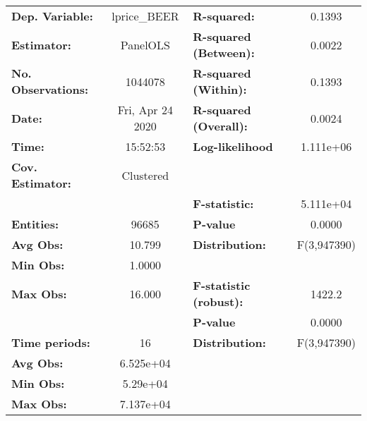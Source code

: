 \documentclass{report}
\begin{document}
\begin{center}
\begin{tabular}{lclc}
\toprule
\textbf{Dep. Variable:}       &    lprice\_BEER    & \textbf{  R-squared:         }   &      0.1393      \\
\textbf{Estimator:}           &      PanelOLS      & \textbf{  R-squared (Between):}  &      0.0022      \\
\textbf{No. Observations:}    &      1044078       & \textbf{  R-squared (Within):}   &      0.1393      \\
\textbf{Date:}                &  Fri, Apr 24 2020  & \textbf{  R-squared (Overall):}  &      0.0024      \\
\textbf{Time:}                &      15:52:53      & \textbf{  Log-likelihood     }   &    1.111e+06     \\
\textbf{Cov. Estimator:}      &     Clustered      & \textbf{                     }   &                  \\
\textbf{}                     &                    & \textbf{  F-statistic:       }   &    5.111e+04     \\
\textbf{Entities:}            &       96685        & \textbf{  P-value            }   &      0.0000      \\
\textbf{Avg Obs:}             &       10.799       & \textbf{  Distribution:      }   &   F(3,947390)    \\
\textbf{Min Obs:}             &       1.0000       & \textbf{                     }   &                  \\
\textbf{Max Obs:}             &       16.000       & \textbf{  F-statistic (robust):} &      1422.2      \\
\textbf{}                     &                    & \textbf{  P-value            }   &      0.0000      \\
\textbf{Time periods:}        &         16         & \textbf{  Distribution:      }   &   F(3,947390)    \\
\textbf{Avg Obs:}             &     6.525e+04      & \textbf{                     }   &                  \\
\textbf{Min Obs:}             &      5.29e+04      & \textbf{                     }   &                  \\
\textbf{Max Obs:}             &     7.137e+04      & \textbf{                     }   &                  \\
\bottomrule
\end{tabular}
\begin{tabular}{lcccccc}

\end{tabular}
\end{center}
\end{document}
